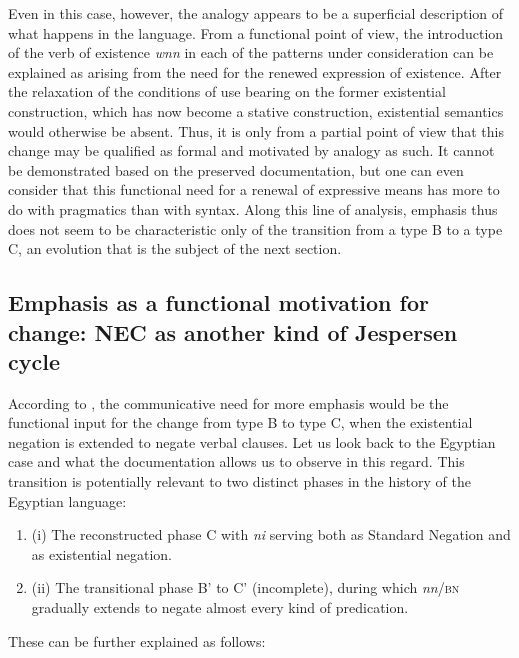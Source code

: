 \documentclass[output=paper]{langsci/langscibook}
\begin{document}
Even in this case, however, the analogy appears to be a superficial description of what happens in the language. From a functional point of view, the introduction of the verb of existence \textit{wnn} in each of the patterns under consideration can be explained as arising from the need for the renewed expression of existence. After the relaxation of the conditions of use bearing on the former existential construction, which has now become a stative construction, existential semantics would otherwise be absent. Thus, it is only from a partial point of view that this change may be qualified as formal and motivated by analogy as such. It cannot be demonstrated based on the preserved documentation, but one can even consider that this functional need for a renewal of expressive means has more to do with pragmatics than with syntax. Along this line of analysis, emphasis thus does not seem to be characteristic only of the transition from a type B to a type C, an evolution that is the subject of the next section.  

\subsection{Emphasis as a functional motivation for change: NEC as another kind of Jespersen cycle}\label{s:AE4-2}

According to \citet{Croft1991}, the communicative need for more emphasis would be the functional input for the change from type B to type C, when the existential negation is extended to negate verbal clauses. Let us look back to the Egyptian case and what the documentation allows us to observe in this regard. This transition is potentially relevant to two distinct phases in the history of the Egyptian language: 
 
\begin{enumerate}
    \item (i) The reconstructed phase C with \textit{ni} serving both as Standard Negation and as existential negation. 
    \item (ii) The transitional phase B’ to C’ (incomplete), during which \textit{nn}/\textsc{bn} gradually extends to negate almost every kind of predication. 
\end{enumerate} 

These can be further explained as follows: 
 
\end{document}
